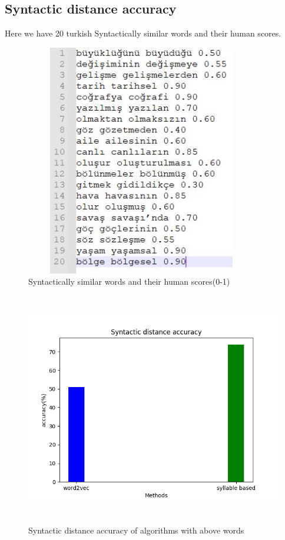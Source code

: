 \documentclass{article}
\begin{document}
\subsection{Syntactic distance accuracy}
Here we have 20 turkish Syntactically similar words and their human scores.
\begin{figure}[H]
    \centering
	\includegraphics[width=4in, height=4in]{18.JPG}
	\caption[Optional caption]{Syntactically similar words and their human scores(0-1)}
	\label{}
\end{figure}
\cleardoublepage
\begin{figure}[H]
    \centering
	\includegraphics[width=6in, height=4in]{syn_dist.png}
	\caption[Optional caption]{Syntactic distance accuracy of algorithms with above words}
	\label{}
\end{figure}
\end{document}

